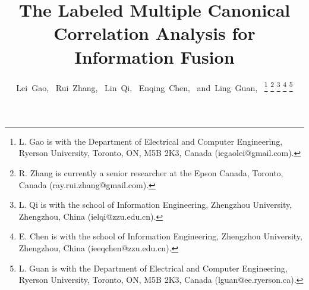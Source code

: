 \documentclass[journal]{IEEEtran}
\begin{document}
%
\title{The Labeled Multiple Canonical Correlation Analysis for Information Fusion}
%
%
%

\author{Lei~Gao,~%
        Rui~Zhang,~
        Lin~Qi,~%
        Enqing~Chen,~
        and~Ling~Guan,~%
\thanks{L. Gao is with the Department of Electrical and Computer Engineering, Ryerson University, Toronto, ON, M5B 2K3, Canada (iegaolei@gmail.com).}
\thanks{R. Zhang is currently a senior researcher at the Epson Canada, Toronto, Canada (ray.rui.zhang@gmail.com).}
\thanks{L. Qi is with the school of Information Engineering, Zhengzhou University, Zhengzhou, China (ielqi@zzu.edu.cn).}
\thanks{E. Chen is with the school of Information Engineering, Zhengzhou University, Zhengzhou, China (ieeqchen@zzu.edu.cn).}
\thanks{L. Guan is with the Department of Electrical and Computer Engineering, Ryerson University, Toronto, ON, M5B 2K3, Canada (lguan@ee.ryerson.ca).}}
%
%
\end{document}
